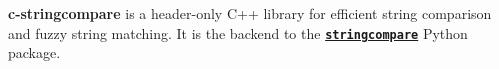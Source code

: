 {\bfseries{c-\/stringcompare}} is a header-\/only C++ library for efficient string comparison and fuzzy string matching. It is the backend to the \href{https://github.com/olivierBinette/stringcompare}{\texttt{ {\bfseries{stringcompare}}}} Python package. 